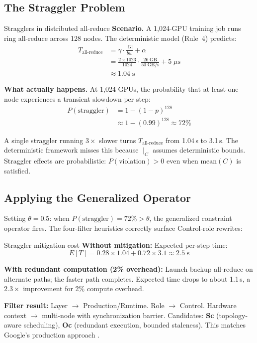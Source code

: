 \documentclass[10pt,twocolumn]{article}
\begin{document}
\subsection{The Straggler Problem}

\begin{errorcase}{Stragglers in distributed all-reduce}
\textbf{Scenario.} A 1,024-GPU training job runs ring all-reduce across 128 nodes. The deterministic model (Rule~4) predicts:
\begin{align*}
T_{\text{all-reduce}} &= \gamma \cdot \frac{|G|}{bw} + \alpha \\
&= \tfrac{2 \times 1023}{1024} \cdot \tfrac{26\;\text{GB}}{50\;\text{GB/s}} + 5\;\mu\text{s} \\
&\approx 1.04\;\text{s}
\end{align*}

\textbf{What actually happens.} At 1,024 GPUs, the probability that at least one node experiences a transient slowdown per step:
\begin{align*}
P(\text{straggler}) &= 1 - (1 - p)^{128} \\
&\approx 1 - (0.99)^{128} \approx 72\%
\end{align*}

A single straggler running $3\times$ slower turns $T_{\text{all-reduce}}$ from 1.04\,s to 3.1\,s. The deterministic framework misses this because $\mid_C$ assumes deterministic bounds. Straggler effects are probabilistic: $P(\text{violation}) > 0$ even when $\text{mean}(C)$ is satisfied.
\end{errorcase}

\subsection{Applying the Generalized Operator}

Setting $\theta = 0.5$: when $P(\text{straggler}) = 72\% > \theta$, the generalized constraint operator fires. The four-filter heuristics correctly surface Control-role rewrites:

\begin{napkinmath}{Straggler mitigation cost}
\textbf{Without mitigation:} Expected per-step time:
\[
E[T] = 0.28 \times 1.04 + 0.72 \times 3.1 \approx 2.5\;\text{s}
\]

\textbf{With redundant computation (2\% overhead):} Launch backup all-reduce on alternate paths; the faster path completes. Expected time drops to about 1.1\,s, a $2.3\times$ improvement for 2\% compute overhead.

\textbf{Filter result:} Layer $\to$ Production/Runtime. Role $\to$ Control. Hardware context $\to$ multi-node with synchronization barrier. Candidates: \textbf{Sc} (topology-aware scheduling), \textbf{Oc} (redundant execution, bounded staleness). This matches Google's production approach \citep{dean2013}.
\end{napkinmath}
\end{document}
